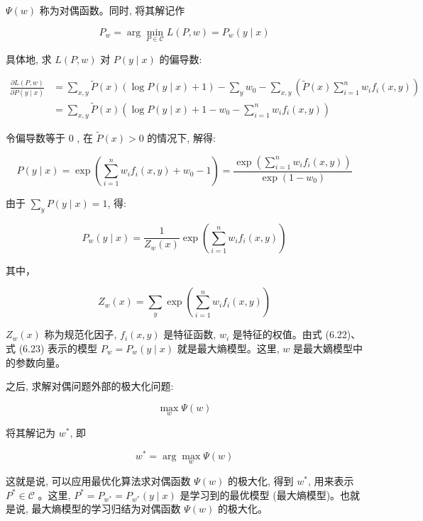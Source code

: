 \documentclass[10pt]{article}
\begin{document}
\begin{CJK*}{UTF8}{bsmi}
$\Psi(w)$ 称为对偶函数。同时, 将其解记作


\begin{equation*}
P_{w}=\arg \min _{P \in \mathcal{C}} L(P, w)=P_{w}(y \mid x) \tag{6.21}
\end{equation*}


具体地, 求 $L(P, w)$ 对 $P(y \mid x)$ 的偏导数:

$$
\begin{aligned}
\frac{\partial L(P, w)}{\partial P(y \mid x)} & =\sum_{x, y} \tilde{P}(x)(\log P(y \mid x)+1)-\sum_{y} w_{0}-\sum_{x, y}\left(\tilde{P}(x) \sum_{i=1}^{n} w_{i} f_{i}(x, y)\right) \\
& =\sum_{x, y} \tilde{P}(x)\left(\log P(y \mid x)+1-w_{0}-\sum_{i=1}^{n} w_{i} f_{i}(x, y)\right)
\end{aligned}
$$

令偏导数等于 0 , 在 $\tilde{P}(x)>0$ 的情况下, 解得:

$$
P(y \mid x)=\exp \left(\sum_{i=1}^{n} w_{i} f_{i}(x, y)+w_{0}-1\right)=\frac{\exp \left(\sum_{i=1}^{n} w_{i} f_{i}(x, y)\right)}{\exp \left(1-w_{0}\right)}
$$

由于 $\sum_{y} P(y \mid x)=1$, 得:


\begin{equation*}
P_{w}(y \mid x)=\frac{1}{Z_{w}(x)} \exp \left(\sum_{i=1}^{n} w_{i} f_{i}(x, y)\right) \tag{6.22}
\end{equation*}


其中，


\begin{equation*}
Z_{w}(x)=\sum_{y} \exp \left(\sum_{i=1}^{n} w_{i} f_{i}(x, y)\right) \tag{6.23}
\end{equation*}


$Z_{w}(x)$ 称为规范化因子, $f_{i}(x, y)$ 是特征函数, $w_{i}$ 是特征的权值。由式 (6.22)、式 (6.23) 表示的模型 $P_{w}=P_{w}(y \mid x)$ 就是最大熵模型。这里, $w$ 是最大嫡模型中的参数向量。

之后, 求解对偶问题外部的极大化问题:


\begin{equation*}
\max _{w} \Psi(w) \tag{6.24}
\end{equation*}


将其解记为 $w^{*}$, 即


\begin{equation*}
w^{*}=\arg \max _{w} \Psi(w) \tag{6.25}
\end{equation*}


这就是说, 可以应用最优化算法求对偶函数 $\Psi(w)$ 的极大化, 得到 $w^{*}$, 用来表示 $P^{*} \in \mathcal{C}$ 。这里, $P^{*}=P_{w^{*}}=P_{w^{*}}(y \mid x)$ 是学习到的最优模型 (最大熵模型)。也就是说, 最大熵模型的学习归结为对偶函数 $\Psi(w)$ 的极大化。


\end{CJK*}
\end{document}
